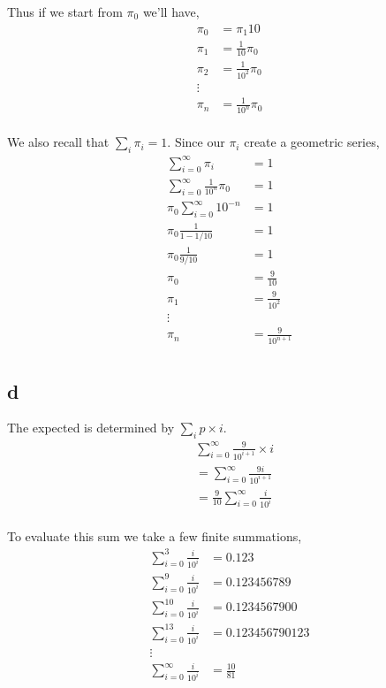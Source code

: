 \documentclass{article}
\begin{document}
Thus if we start from $\pi_0$ we'll have,
\begin{align*}
    \pi_0 &= \pi_1 10 \\
    \pi_1 &= \frac{1}{10} \pi_0 \\
    \pi_2 &= \frac{1}{10^2} \pi_0 \\
    \vdots \\
    \pi_n &= \frac{1}{10^n} \pi_0 \\
\end{align*}

We also recall that $\sum_i \pi_i = 1$. Since our $\pi_i$ create a geometric
series,
\begin{align*}
    \sum_{i=0}^\infty \pi_i &= 1 \\
    \sum_{i=0}^\infty \frac{1}{10^n} \pi_0 &= 1 \\
    \pi_0 \sum_{i=0}^\infty 10^{-n} &= 1 \\
    \pi_0 \frac{1}{1-1/10} &= 1 \\
    \pi_0 \frac{1}{9/10} &= 1 \\
    \pi_0 &= \frac{9}{10} \\
    \pi_1 &= \frac{9}{10^2} \\
    \vdots \\
    \pi_n &= \frac{9}{10^{n+1}} \\
\end{align*}

\subsection{d}
The expected is determined by $\sum_i p \times i$.
\begin{align*}
    &\sum_{i=0}^\infty \frac{9}{10^{i+1}} \times i \\
    &= \sum_{i=0}^\infty \frac{9i}{10^{i+1}} \\
    &= \frac{9}{10} \sum_{i=0}^\infty \frac{i}{10^i} \\
\end{align*}

To evaluate this sum we take a few finite summations,
\begin{align*}
    \sum_{i=0}^3 \frac{i}{10^i} &= 0.123 \\
    \sum_{i=0}^9 \frac{i}{10^i} &= 0.123456789 \\
    \sum_{i=0}^10 \frac{i}{10^i} &= 0.1234567900 \\
    \sum_{i=0}^13 \frac{i}{10^i} &= 0.123456790123 \\
    \vdots \\
    \sum_{i=0}^\infty \frac{i}{10^i} &= \frac{10}{81} \\
\end{align*}
\end{document}
